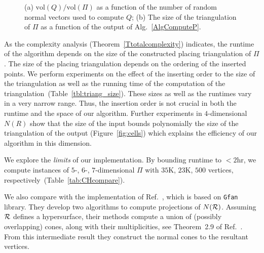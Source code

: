 \documentclass{article}
\newcommand\refcite[1]{\citealp{#1}} \newcommand\citess[1]{\textsuperscript{\textup{\citealp{#1}}}}
\begin{document}
\begin{figure}[t]
  \centering
{}
\caption{
(a) $\mbox{vol}(Q)/\mbox{vol}(\varPi)$ as a function of the number of
random normal vectors used to compute $Q$;
(b) The size of the triangulation of $\varPi$ as a function of the
output of Alg.~\ref{AlgComputeP}.
}
\label{fig:2}
\end{figure}

As the complexity analysis (Theorem~\ref{Ttotalcomplexity})
indicates, the runtime of the algorithm depends on the
size of the constructed placing triangulation of $\varPi$. The size
of the placing triangulation depends on the ordering of the inserted points. We
perform experiments on the effect of the inserting order to the size of the
triangulation as well as the running time of the computation of the 
triangulation~(Table~\ref{tbl:triang_size}). These sizes as well as the
runtimes vary in a very narrow range. Thus, the insertion order is not crucial
in both the runtime and the space of our algorithm.
Further experiments in $4$-dimensional $N(R)$ show
that the size of the input bounds polynomially the
size of the triangulation of the output (Figure~\ref{fig:cells}) which explains
the efficiency of our algorithm in this dimension.

We explore the \textit{limits} of our implementation. By bounding
runtime to $<2$hr, we compute instances of $5$-, $6$-, $7$-di\-men\-sional
$\varPi$ with $35$K, $23$K, $500$ vertices,
respectively\ (Table~\ref{tab:CHcompare}).

We also compare with the implementation of Ref.~\refcite{JensenYu11}, which
is based on \texttt{Gfan} library.
They develop two algorithms to compute projections of $N({\mathcal R})$.
Assuming ${\mathcal R}$ defines a hypersurface, their methods compute
a union of (possibly overlapping) cones, along with their
multiplicities, see Theorem~2.9 of Ref.~\refcite{JensenYu11}.
From this intermediate result they construct the normal cones to the resultant
vertices.
\end{document}
